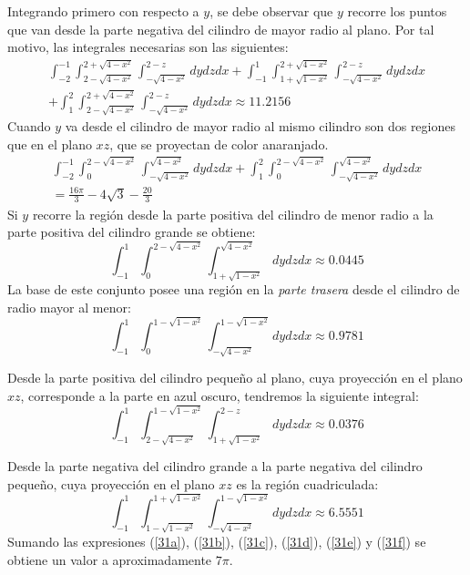Integrando primero con respecto a $y$, se debe observar que
$y$ recorre los puntos que van desde la parte negativa del cilindro de mayor radio al plano.
Por tal motivo, las integrales necesarias son las siguientes:
\begin{eqnarray}
\int_{-2}^{-1}\int_{2-\sqrt{4-x^2}}^{2+\sqrt{4-x^2}}\int_{-\sqrt{4-x^2}}^{2-z}dydzdx+
\int_{-1}^{1}\int_{1+\sqrt{1-x^2}}^{2+\sqrt{4-x^2}}\int_{-\sqrt{4-x^2}}^{2-z}dydzdx \nonumber \\
+ \int_{1}^2\int_{2-\sqrt{4-x^2}}^{2+\sqrt{4-x^2}}\int_{-\sqrt{4-x^2}}^{2-z}dydzdx \approx 11.2156 \label{31a}
\end{eqnarray}
Cuando $y$ va desde el cilindro de mayor radio al mismo cilindro son dos regiones que en el plano $xz$, que se proyectan de color anaranjado.
\begin{eqnarray}
\int_{-2}^{-1}\int_{0}^{2-\sqrt{4-x^2}}\int_{-\sqrt{4-x^2}}^{\sqrt{4-x^2}}dydzdx
+\int_{1}^2\int_{0}^{2-\sqrt{4-x^2}}\int_{-\sqrt{4-x^2}}^{\sqrt{4-x^2}}dydzdx \nonumber \\
=\frac{16\pi}{3} -4\sqrt{3} -\frac{20}{3} \label{31b}
\end{eqnarray}
Si $y$ recorre la región desde la parte positiva del cilindro de menor radio a la parte positiva del cilindro grande se obtiene:
\begin{equation}\label{31c}
\int_{-1}^{1}\int_{0}^{2-\sqrt{4-x^2}}\int_{1+\sqrt{1-x^2}}^{\sqrt{4-x^2}}dydzdx\approx 0.0445
\end{equation}
La base de este conjunto posee una región en la \emph{parte trasera} desde el cilindro de radio mayor al menor:
\begin{equation}\label{31d}
\int_{-1}^{1}\int_{0}^{1-\sqrt{1-x^2}}\int_{-\sqrt{4-x^2}}^{1-\sqrt{1-x^2}}dydzdx\approx 0.9781
\end{equation}

Desde la parte positiva del cilindro pequeño al plano, cuya proyección en el plano $xz$, corresponde a la parte en azul oscuro, tendremos la siguiente integral:
\begin{equation}\label{31e}
\int_{-1}^{1}\int_{2-\sqrt{4-x^2}}^{1-\sqrt{1-x^2}}\int_{1+\sqrt{1-x^2}}^{2-z}dydzdx\approx 0.0376
\end{equation}

Desde la parte negativa del cilindro grande a la parte negativa del cilindro pequeño, cuya proyección en el plano $xz$ es la región cuadriculada:
\begin{equation}\label{31f}
\int_{-1}^{1}\int_{1-\sqrt{1-x^2}}^{1+\sqrt{1-x^2}}\int_{-\sqrt{4-x^2}}^{1-\sqrt{1-x^2}}dydzdx\approx 6.5551
\end{equation}
Sumando las expresiones (\ref{31a}), (\ref{31b}), (\ref{31c}), (\ref{31d}), (\ref{31e}) y (\ref{31f})
se obtiene un valor a aproximadamente $7\pi$.


